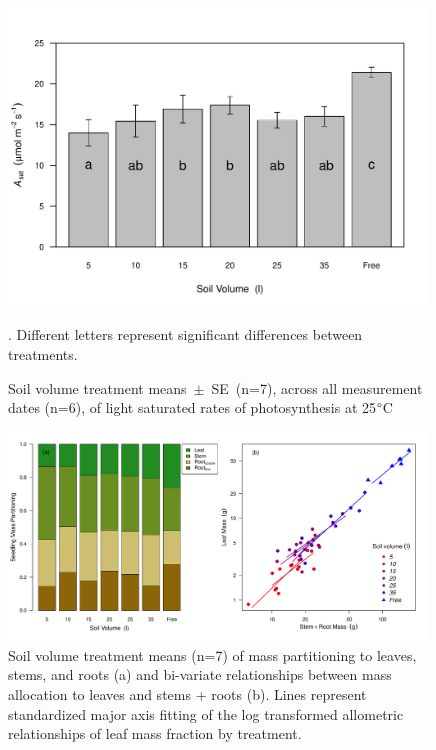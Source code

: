 \documentclass[a4paper]{article}\usepackage[]{graphicx}\usepackage[]{color}
\begin{document}
\begin{figure}[h!]
    \centering
    \includegraphics[width=0.99\textwidth]{Asat.pdf}
    \caption{Soil volume treatment means~$\pm$~SE~(n=7), across all measurement dates (n=6), of light saturated rates of photosynthesis at 25$\degree$C}. Different letters represent significant differences between treatments.
    \label{fig:figure3}
\end{figure}

\begin{figure}[h!]
    \centering
    \includegraphics[width=0.99\textwidth]{massfractions.pdf}
    \caption{Soil volume treatment means (n=7) of mass partitioning to leaves, stems, and roots (a) and bi-variate relationships between mass allocation to leaves and stems + roots (b). Lines represent standardized major axis fitting of the log transformed allometric relationships of leaf mass fraction by treatment.}
    \label{fig:figure4}
\end{figure}
\end{document}
